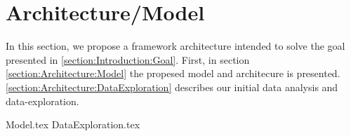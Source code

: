 \chapter{Architecture/Model}
\label{section:Architecture}

In this section, we propose a framework architecture intended to solve the goal presented in \autoref{section:Introduction:Goal}.
First, in section \ref{section:Architecture:Model} the propesed model and architecure is presented.
\autoref{section:Architecture:DataExploration} describes our initial data analysis and data-exploration.

{Model.tex}
{DataExploration.tex}


\iffalse
  Here you will present the architecture or model that you have chosen, and that is (or will be) implemented in your work. Note that putting algorithms in your report is not desirable but in certain cases these might be placed in the appendix. Code further be avoided in the report itself but may be delivered in the fashion requested by the supervisor or, in the case of masters delivery, submitted as additional documents.
\fi
